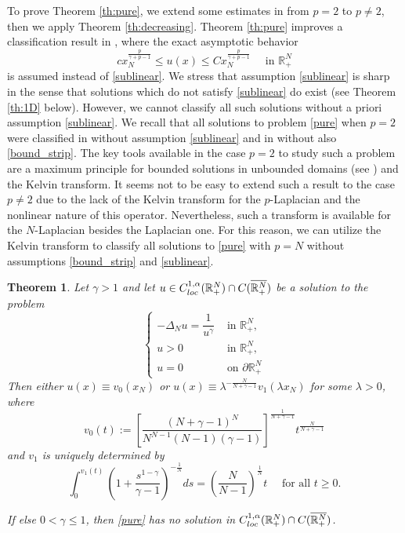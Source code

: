 \documentclass[reqno]{amsart}
\theoremstyle{plain}
\newtheorem{theorem}{Theorem}
\theoremstyle{definition}
\theoremstyle{remark}
\begin{document}
	To prove Theorem \ref{th:pure}, we extend some estimates in \cite{MR4753083} from $p=2$ to $p\ne2$, then we apply Theorem \ref{th:decreasing}.
	Theorem \ref{th:pure} improves a classification result in \cite[Theorem 1.2]{MR4044739}, where the exact asymptotic behavior
	\[
	c x_N^\frac{p}{\gamma+p-1} \le u(x) \le C x_N^\frac{p}{\gamma+p-1} \quad\text{ in } \mathbb{R}^N_+
	\]
	is assumed instead of \eqref{sublinear}. We stress that assumption \eqref{sublinear} is sharp in the sense that solutions which do not satisfy \eqref{sublinear} do exist (see Theorem \ref{th:1D} below). However, we cannot classify all such solutions without a priori assumption \eqref{sublinear}. We recall that all solutions to problem \eqref{pure} when $p=2$ were classified in \cite{MR4753083} without assumption \eqref{sublinear} and in \cite{2024arXiv240403343M} without also \eqref{bound_strip}. The key tools available in the case $p=2$ to study such a problem are a maximum principle for bounded solutions in unbounded domains (see \cite[Lemma 2.1]{MR1470317}) and the Kelvin transform. It seems not to be easy to extend such a result to the case $p\ne2$ due to the lack of the Kelvin transform for the $p$-Laplacian and the nonlinear nature of this operator. Nevertheless, such a transform is available for the $N$-Laplacian besides the Laplacian one. For this reason, we can utilize the Kelvin transform to classify all solutions to \eqref{pure} with $p=N$ without assumptions \eqref{bound_strip} and \eqref{sublinear}.
	\begin{theorem}\label{th:pure_N}
		Let $\gamma>1$ and let $u \in C^{1,\alpha}_{\rm loc}(\mathbb{R}^N_+) \cap C(\overline{\mathbb{R}^N_+})$ be a solution to the problem		
		\begin{equation}\label{pure_N}
			\begin{cases}
				-\Delta_N u = \dfrac{1}{u^\gamma} & \text{ in } \mathbb{R}^N_+,\\
				u>0 & \text{ in } \mathbb{R}^N_+,\\
				u=0 & \text{ on } \partial\mathbb{R}^N_+
			\end{cases}
		\end{equation}
		Then either $u(x)\equiv v_0(x_N)$ or $u(x)\equiv \lambda^{-\frac{N}{N+\gamma-1}} v_1(\lambda x_N)$ for some $\lambda>0$, where
		\[
		v_0(t) := \left[\frac{(N+\gamma-1)^N}{N^{N-1}(N-1)(\gamma-1)}\right]^\frac{1}{N+\gamma-1}	t^\frac{N}{N+\gamma-1}
		\]
		and $v_1$ is uniquely determined by
		\[	
		\int_{0}^{v_1(t)} \left(1 + \frac{s^{1-\gamma}}{\gamma-1}\right)^{-\frac{1}{N}} ds = \left(\frac{N}{N-1}\right)^\frac{1}{N}t \quad\text{ for all } t\ge0.
		\]
		
		If else $0<\gamma\le1$, then \eqref{pure} has no solution in $C^{1,\alpha}_{\rm loc}(\mathbb{R}^N_+) \cap C(\overline{\mathbb{R}^N_+})$.
	\end{theorem}
	
\end{document}
